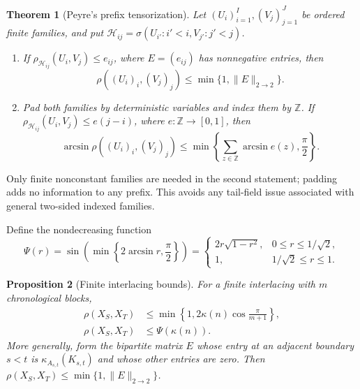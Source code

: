 \documentclass[11pt]{amsart}
\numberwithin{equation}{section}
\newtheorem{theorem}{Theorem}[section]
\newtheorem{proposition}[theorem]{Proposition}
\theoremstyle{definition}
\newcommand{\ZZ}{\mathbb Z}
\newcommand{\cH}{\mathcal H}
\begin{document}
\begin{theorem}[Peyre's prefix tensorization]\label{thm:peyre}
Let $(U_i)_{i=1}^I,(V_j)_{j=1}^J$ be ordered finite families, and put $\cH_{ij}=\sigma(U_{i'}:i'<i,V_{j'}:j'<j)$.
\begin{enumerate}
\item If $\rho_{\cH_{ij}}(U_i,V_j)\le e_{ij}$, where $E=(e_{ij})$ has nonnegative entries, then
\begin{equation}\label{eq:peyre-matrix}
\rho((U_i)_i,(V_j)_j)\le\min\{1,\|E\|_{2\to2}\}.
\end{equation}
\item Pad both families by deterministic variables and index them by $\ZZ$. If $\rho_{\cH_{ij}}(U_i,V_j)\le e(j-i)$, where $e:\ZZ\to[0,1]$, then
\begin{equation}\label{eq:peyre-arcsine}
\arcsin\rho((U_i)_i,(V_j)_j)
\le\min\left\{\sum_{z\in\ZZ}\arcsin e(z),\frac\pi2\right\}.
\end{equation}
\end{enumerate}
\end{theorem}

Only finite nonconstant families are needed in the second statement; padding adds no information to any prefix. This avoids any tail-field issue associated with general two-sided indexed families.

Define the nondecreasing function
\begin{equation}\label{eq:psi}
\Psi(r)=\sin\!\left(\min\left\{2\arcsin r,\frac\pi2\right\}\right)
=\begin{cases}
2r\sqrt{1-r^2},&0\le r\le1/\sqrt2,\\
1,&1/\sqrt2\le r\le1.
\end{cases}
\end{equation}

\begin{proposition}[Finite interlacing bounds]\label{prop:finite}
For a finite interlacing with $m$ chronological blocks,
\begin{align}
\rho(X_S,X_T)&\le\min\left\{1,2\kappa(n)\cos\frac\pi{m+1}\right\},\label{eq:finite-path}\\
\rho(X_S,X_T)&\le\Psi(\kappa(n)).\label{eq:finite-arcsine}
\end{align}
More generally, form the bipartite matrix $E$ whose entry at an adjacent boundary $s<t$ is $\kappa_{A_{s,t}}(K_{s,t})$ and whose other entries are zero. Then $\rho(X_S,X_T)\le\min\{1,\|E\|_{2\to2}\}$.
\end{proposition}
\end{document}
